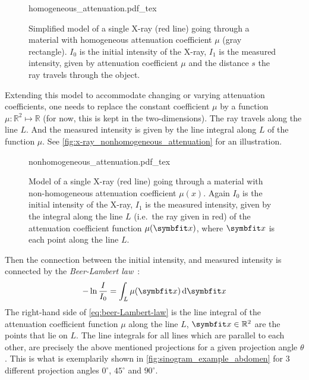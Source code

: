\begin{figure}
	\centering
	\def\svgwidth{0.75\textwidth}
	{homogeneous_attenuation.pdf_tex}
	\caption{Simplified model of a single X-ray (red line) going through a material with
		homogeneous attenuation coefficient \(\mu\) (gray rectangle). \(I_0\) is the initial
		intensity of the X-ray, \(I_1\) is the measured intensity, given by attenuation
		coefficient \(\mu\) and the distance \(s\) the ray travels through the
		object.}\label{fig:x-ray_homogeneous_attenuation}
\end{figure}

Extending this model to accommodate changing or varying attenuation coefficients, one needs to
replace the constant coefficient \(\mu\) by a function \(\mu: \mathbb{R}^2 \mapsto \mathbb{R}\) (for
now, this is kept in the two-dimensions). The ray travels along the line \(L\). And the measured
intensity is given by the line integral along \(L\) of the function \(\mu\). See
\autoref{fig:x-ray_nonhomogeneous_attenuation} for an illustration.

\begin{figure}
	\centering
	\def\svgwidth{0.75\textwidth}
	{nonhomogeneous_attenuation.pdf_tex}
	\caption{Model of a single X-ray (red line) going through a material with
		non-homogeneous attenuation coefficient \(\mu(x)\). Again \(I_0\) is the initial
		intensity of the X-ray, \(I_1\) is the measured intensity, given by the integral
		along the line \(L\) (i.e.\ the ray given in red) of the attenuation coefficient
		function \(\mu(\mvec{x})\), where \(\mvec{x}\) is each point along the line
		\(L\).}\label{fig:x-ray_nonhomogeneous_attenuation}
\end{figure}

Then the connection between the initial intensity, and measured intensity is connected by the
\textit{Beer-Lambert law}~\cite{buzug_computed_2008}:
\begin{equation}\label{eq:beer-Lambert-law}
	- \ln \frac{I}{I_0} = \int_L \mu (\mvec{x}) \, \mathrm{d}\mvec{x}
\end{equation}
The right-hand side of \autoref{eq:beer-Lambert-law} is the line integral of the attenuation
coefficient function \(\mu\) along the line \(L\), \(\mvec{x} \in \mathbb{R}^2\) are the points that
lie on \(L\). The line integrals for all lines which are parallel to each other, are precisely the
above mentioned projections for a given projection angle \(\theta\). This is what is exemplarily
shown in \autoref{fig:sinogram_example_abdomen} for 3 different projection angles \(0^\circ\),
\(45^\circ\) and \(90^\circ\).

